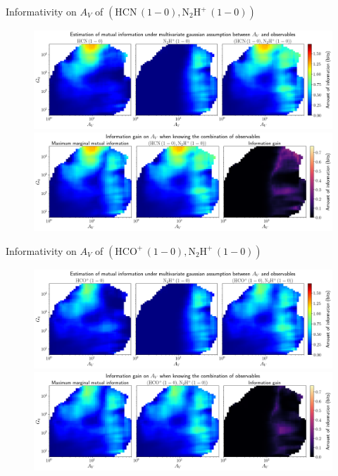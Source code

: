\documentclass{beamer}
\begin{document}
\begin{frame}{Informativity on $A_V$ of $\left(\mathrm{HCN\,(1-0)},\mathrm{N_2H^+\,(1-0)}\right)$}
    \begin{figure}
        \centering
        \includegraphics[width=0.95\linewidth]{../linearinfo/av__hcn10_n2hp10_linearinfo.png}
        \vfill
        \includegraphics[width=0.95\linewidth]{../linearinfo/av__hcn10_n2hp10_linearinfo_gain.png}
    \end{figure}
\end{frame}

\begin{frame}{Informativity on $A_V$ of $\left(\mathrm{HCO^+\,(1-0)},\mathrm{N_2H^+\,(1-0)}\right)$}
    \begin{figure}
        \centering
        \includegraphics[width=0.95\linewidth]{../linearinfo/av__hcop10_n2hp10_linearinfo.png}
        \vfill
        \includegraphics[width=0.95\linewidth]{../linearinfo/av__hcop10_n2hp10_linearinfo_gain.png}
    \end{figure}
\end{frame}
\end{document}
